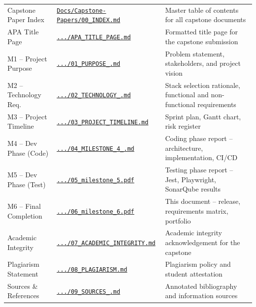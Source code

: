 \documentclass[12pt,letterpaper]{article}
\begin{document}
{\begin{longtable}{|>{\raggedright\arraybackslash}p{3.5cm}|>{\raggedright\arraybackslash}p{4.8cm}|>{\raggedright\arraybackslash}p{4.7cm}|}
\multicolumn{3}{|l|}{\cellcolor{LunaraBlue!10}\textbf{Capstone Milestone Papers}} \\
\hline
\rowcolor{TableRowAlt}
Capstone Paper Index & \href{\ghblob/Docs/Capstone-Papers/00_INDEX.md}{\texttt{Docs/Capstone-Papers/00\_INDEX.md}} & Master table of contents for all capstone documents \\
\hline
APA Title Page & \href{\ghblob/Docs/Capstone-Papers/APA_TITLE_PAGE.md}{\texttt{.../APA\_TITLE\_PAGE.md}} & Formatted title page for the capstone submission \\
\hline
\rowcolor{TableRowAlt}
M1 -- Project Purpose & \href{\ghblob/Docs/Capstone-Papers/01_PURPOSE_OF_CAPSTONE_PROJECT.md}{\texttt{.../01\_PURPOSE\_.md}} & Problem statement, stakeholders, and project vision \\
\hline
M2 -- Technology Req. & \href{\ghblob/Docs/Capstone-Papers/02_TECHNOLOGY_REQUIREMENTS.md}{\texttt{.../02\_TECHNOLOGY\_.md}} & Stack selection rationale, functional and non-functional requirements \\
\hline
\rowcolor{TableRowAlt}
M3 -- Project Timeline & \href{\ghblob/Docs/Capstone-Papers/03_PROJECT_TIMELINE.md}{\texttt{.../03\_PROJECT\_TIMELINE.md}} & Sprint plan, Gantt chart, risk register \\
\hline
M4 -- Dev Phase (Code) & \href{\ghblob/Docs/Capstone-Papers/04_MILESTONE_4_DEVELOPMENT_PHASE_CODING.md}{\texttt{.../04\_MILESTONE\_4\_.md}} & Coding phase report -- architecture, implementation, CI/CD \\
\hline
\rowcolor{TableRowAlt}
M5 -- Dev Phase (Test) & \href{\ghblob/Docs/Capstone-Papers/05_milestone_5.pdf}{\texttt{.../05\_milestone\_5.pdf}} & Testing phase report -- Jest, Playwright, SonarQube results \\
\hline
M6 -- Final Completion & \href{\ghblob/Docs/Capstone-Papers/06_milestone_6.pdf}{\texttt{.../06\_milestone\_6.pdf}} & This document -- release, requirements matrix, portfolio \\
\hline
\rowcolor{TableRowAlt}
Academic Integrity & \href{\ghblob/Docs/Capstone-Papers/07_ACADEMIC_INTEGRITY.md}{\texttt{.../07\_ACADEMIC\_INTEGRITY.md}} & Academic integrity acknowledgement for the capstone \\
\hline
Plagiarism Statement & \href{\ghblob/Docs/Capstone-Papers/08_PLAGIARISM.md}{\texttt{.../08\_PLAGIARISM.md}} & Plagiarism policy and student attestation \\
\hline
\rowcolor{TableRowAlt}
Sources \& References & \href{\ghblob/Docs/Capstone-Papers/09_SOURCES_OF_INFORMATION_AND_REFERENCES.md}{\texttt{.../09\_SOURCES\_.md}} & Annotated bibliography and information sources \\

\end{longtable}}
\end{document}
